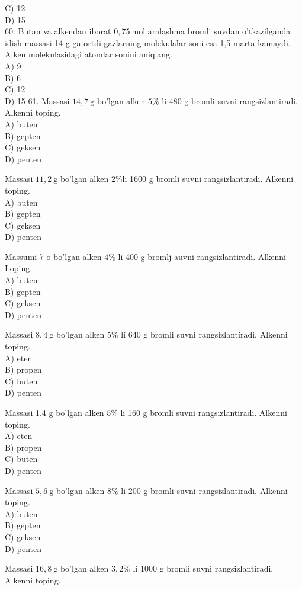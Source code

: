 C) 12\\
D) 15\\
60. Butan va alkendan iborat $0,75 \mathrm{~mol}$ aralashma bromli suvdan o'tkazilganda idish massasi 14 g ga ortdi gazlarning molekulalar soni esa 1,5 marta kamaydi. Alken molekulasidagi atomlar sonini aniqlang.\\
A) 9\\
B) 6\\
C) 12\\
D) 15
61. Massasi $14,7 \mathrm{~g}$ bo'lgan alken $5 \%$ li 480 g bromli suvni rangsizlantiradi. Alkenni toping.\\
A) buten\\
B) gepten\\
C) geksen\\
D) penten
  \item Massasi $11,2 \mathrm{~g}$ bo'lgan alken $2 \% \mathrm{li}$ 1600 g bromli suvni rangsizlantiradi. Alkenni toping.\\
A) buten\\
B) gepten\\
C) geksen\\
D) penten
  \item Massumi 7 o bo'lgan alken $4 \%$ li 400 g bromlj auvni rangsizlantiradi. Alkenni Loping.\\
A) buten\\
B) gepten\\
C) geksen\\
D) penten
  \item Massasi $8,4 \mathrm{~g}$ bo'lgan alken $5 \%$ lí 640 g bromli suvni rangsizlantíradi. Alkenni toping.\\
A) eten\\
B) propen\\
C) buten\\
D) penten
  \item Massasi 1.4 g bo'lgan alken $5 \%$ li 160 g bromli suvni rangsizlantiradi. Alkenni toping.\\
A) eten\\
B) propen\\
C) buten\\
D) penten
  \item Massasi $5,6 \mathrm{~g}$ bo'lgan alken $8 \%$ li 200 g bromli suvni rangsizlantiradi. Alkenni toping.\\
A) buten\\
B) gepten\\
C) geksen\\
D) penten
  \item Massasi $16,8 \mathrm{~g}$ bo'lgan alken $3,2 \%$ li 1000 g bromli suvni rangsizlantiradi. Alkenni toping.\\

